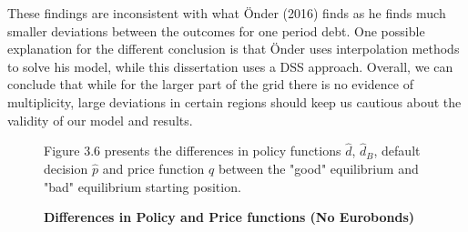 These findings are inconsistent with what Önder (2016) finds as he finds much smaller deviations between the outcomes for one period debt. One possible explanation for the different conclusion is that Önder uses interpolation methods to solve his model, while this dissertation uses a DSS approach. Overall, we can conclude that while for the larger part of the grid there is no evidence of multiplicity, large deviations in certain regions should keep us cautious about the validity of our model and results.\\
 \begin{figure}[H] \label{fig:mult no eurobond}
 \caption{\textbf{Differences in Policy and Price functions (No Eurobonds)}}
       \begin{tablenotes}
      \footnotesize
      \item Figure 3.6 presents the differences in policy functions $\hat{d}$, $\hat{d}_B$, default decision $\hat{p}$ and price function $q$ between the "good" equilibrium and "bad" equilibrium starting position. 
    \end{tablenotes}
\end{figure}
